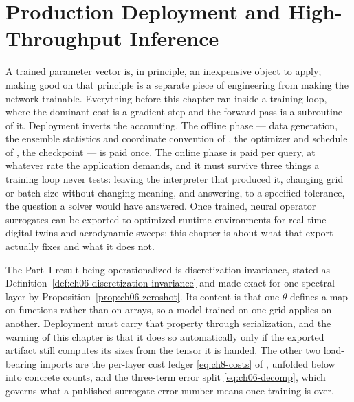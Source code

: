 
\chapter{Production Deployment and High-Throughput Inference}
\label{ch:part2-production-deployment-and-high-throughput-}
\label{sec:deployment}

A trained parameter vector is, in principle, an inexpensive object to apply;
making good on that principle is a separate piece of engineering from making the
network trainable. Everything before this chapter ran inside a training loop,
where the dominant cost is a gradient step and the forward pass is a subroutine
of it. Deployment inverts the accounting. The offline phase --- data generation,
the ensemble statistics and
coordinate convention of
, the optimizer and
schedule of
, the checkpoint ---
is paid once. The online phase is paid per query, at whatever rate the
application demands, and it must survive three things a training loop never
tests: leaving the interpreter that produced it, changing grid or batch size
without changing meaning, and answering, to a specified tolerance, the question a
solver would have answered. Once trained, neural operator
surrogates can be exported to optimized runtime environments for real-time
digital twins and aerodynamic sweeps; this chapter is about what that export
actually fixes and what it does not.

The Part~I result being operationalized is discretization invariance, stated as
Definition~\ref{def:ch06-discretization-invariance} and made exact for one
spectral layer by Proposition~\ref{prop:ch06-zeroshot}. Its content is that one
$\theta$ defines a map on functions rather than on arrays, so a model trained on
one grid applies on another. Deployment must carry that property through
serialization, and the warning of this chapter is that it does so automatically
only if the exported artifact still computes its sizes from the tensor it is
handed. The other two load-bearing imports are the per-layer
cost ledger \eqref{eq:ch8-costs} of
, unfolded below into
concrete counts, and the three-term error split \eqref{eq:ch06-decomp}, which
governs what a published surrogate error number means once training is over.


